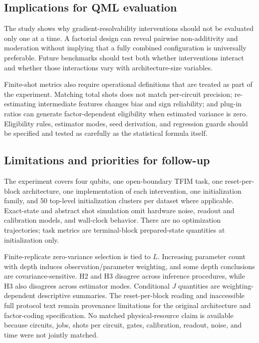 \documentclass[pdflatex,sn-basic,Numbered]{sn-jnl}
\begin{document}
\subsection{Implications for QML evaluation}

The study shows why gradient-resolvability interventions should not be evaluated only one at a time. A factorial design can reveal pairwise non-additivity and moderation without implying that a fully combined configuration is universally preferable. Future benchmarks should test both whether interventions interact and whether those interactions vary with architecture-size variables.

Finite-shot metrics also require operational definitions that are treated as part of the experiment. Matching total shots does not match per-circuit precision; re-estimating intermediate features changes bias and sign reliability; and plug-in ratios can generate factor-dependent eligibility when estimated variance is zero. Eligibility rules, estimator modes, seed derivation, and regression guards should be specified and tested as carefully as the statistical formula itself.

\subsection{Limitations and priorities for follow-up}\label{sec:limitations}

The experiment covers four qubits, one open-boundary TFIM task, one reset-per-block architecture, one implementation of each intervention, one initialization family, and 50 top-level initialization clusters per dataset where applicable. Exact-state and abstract shot simulation omit hardware noise, readout and calibration models, and wall-clock behavior. There are no optimization trajectories; task metrics are terminal-block prepared-state quantities at initialization only.

Finite-replicate zero-variance selection is tied to $L$. Increasing parameter count with depth induces observation/parameter weighting, and some depth conclusions are covariance-sensitive. H2 and H3 disagree across inference procedures, while H3 also disagrees across estimator modes. Conditional $J$ quantities are weighting-dependent descriptive summaries. The reset-per-block reading and inaccessible full protocol text remain provenance limitations for the original architecture and factor-coding specification. No matched physical-resource claim is available because circuits, jobs, shots per circuit, gates, calibration, readout, noise, and time were not jointly matched.
\end{document}
